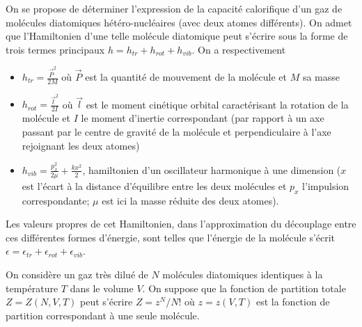 On se propose de déterminer l'expression de la capacité calorifique d'un gaz de molécules diatomiques  hétéro-nucléaires (avec deux atomes différents). On admet que l'Hamiltonien d'une telle molécule diatomique peut s'écrire sous la forme de trois termes principaux $h = h_{tr} + h_{rot} + h_{vib}$. On a respectivement

\begin{itemize}

\item 
$h_{tr} =\frac{\vec{P}^2}{2M}$ où $\vec{P}$ est la quantité de mouvement de la molécule et $M$ sa masse

\item
$h_{rot} =\frac{\vec{l}^2}{2I}$ où $\vec{l}$ est le moment cinétique orbital caractérisant la rotation de la molécule et $I$ le moment d'inertie correspondant (par rapport à  un axe passant par le centre de gravité de la molécule et perpendiculaire à  l'axe rejoignant les deux atomes)

\item
$h_{vib} =\frac{p_x^2}{2\mu}+\frac{k x^2}{2}$, hamiltonien d'un oscillateur harmonique à  une dimension ($x$ est l'écart à  la distance d'équilibre entre les deux molécules et $p_x$ l'impulsion correspondante; $\mu$ est ici la masse réduite des deux atomes).

\end{itemize}


Les valeurs propres de cet Hamiltonien, dans l'approximation du découplage entre ces différentes formes d'énergie, sont telles que l'énergie de la molécule s'écrit $\epsilon =\epsilon_{tr}+\epsilon_{rot}+\epsilon_{vib}$.

On considère un gaz très dilué de $N$ molécules diatomiques identiques à  la température $T$ dans le volume $V$. On suppose que la fonction de partition totale $Z=Z(N,V,T)$ peut s'écrire $Z= z^N/N!$ où $z=z(V,T)$ est la fonction de partition correspondant à  une seule molécule.





